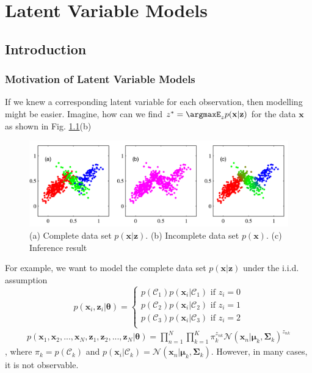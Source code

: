 \chapter{Latent Variable Models}
\section{Introduction}
\subsection{Motivation of Latent Variable Models}
\label{sec:intro_motivation}
If we knew a corresponding latent variable for each observation, then modelling might be easier. Imagine, how can we find $z^* = \argmaxE_{z} p(\mathbf{x|z})$ for the data $\mathbf{x}$ as shown in Fig. \ref{fig:clusters}(b)

\begin{figure}[h]
	\begin{center}			
		\includegraphics[scale=0.25]{./images/generative/latent.png}
	\end{center}
	\caption{(a) Complete data set $p(\mathbf{x|z})$. (b) Incomplete data set $p(\mathbf{x})$. (c) Inference result}
	\label{fig:clusters}
\end{figure}
For example, we want to model the complete data set $p(\mathbf{x|z})$ under the i.i.d. assumption 
\begin{equation*}
p(\mathbf{x}_i, \mathbf{z}_i|\boldsymbol{\theta}) = 
\begin{cases}
p(\mathcal{C}_1)p(\mathbf{x}_i|\mathcal{C}_1) \textrm{ if } z_i=0\\
p(\mathcal{C}_2)p(\mathbf{x}_i|\mathcal{C}_2) \textrm{ if } z_i=1\\
p(\mathcal{C}_3)p(\mathbf{x}_i|\mathcal{C}_3) \textrm{ if } z_i=2\\
\end{cases}
\end{equation*}
\begin{align*}
p(\mathbf{x}_1, \mathbf{x}_2,...,\mathbf{x}_N, \mathbf{z}_1, \mathbf{z}_2, ..., \mathbf{z}_N|\boldsymbol{\theta}) = \prod_{n=1}^{N}\prod_{k=1}^{K}\pi_k^{z_{nk}}\mathcal{N}(\mathbf{x}_n|\boldsymbol{\mu}_k, \boldsymbol{\Sigma}_k)^{z_{nk}}
\end{align*}
, where $\pi_k=p(\mathcal{C}_k)$ and $p(\mathbf{x}_i|\mathcal{C}_k)=\mathcal{N}(\mathbf{x}_n|\boldsymbol{\mu}_k, \boldsymbol{\Sigma}_k)$. However, in many cases, it is not observable. 

